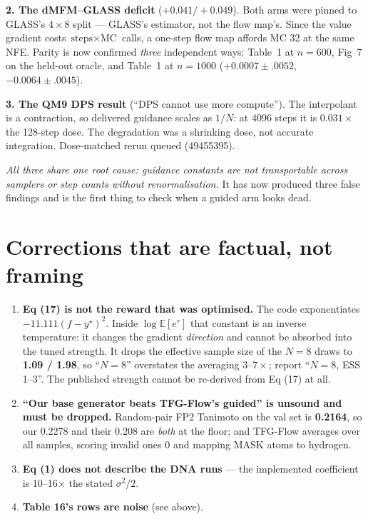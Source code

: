 \documentclass[10pt]{article}
\begin{document}
\textbf{2. The dMFM--GLASS deficit} ($+0.041/+0.049$). Both arms were pinned to GLASS's
$4\times8$ split --- GLASS's estimator, not the flow map's. Since the value gradient costs
$\text{steps}\times\text{MC}$ calls, a one-step flow map affords MC 32 at the same NFE. Parity is now
confirmed \emph{three} independent ways: Table~1 at $n{=}600$, Fig~7 on the held-out oracle, and
Table~1 at $n{=}1000$ ($+0.0007\pm.0052$, $-0.0064\pm.0045$).

\textbf{3. The QM9 DPS result} (``DPS cannot use more compute''). The interpolant is a contraction,
so delivered guidance scales as $1/N$: at 4096 steps it is $0.031\times$ the 128-step dose. The
degradation was a shrinking dose, not accurate integration. Dose-matched rerun queued (49455395).

\noindent\emph{All three share one root cause: guidance constants are not transportable across
samplers or step counts without renormalisation.} It has now produced three false findings and is
the first thing to check when a guided arm looks dead.

\section{Corrections that are factual, not framing}
\label{sec:factual}

\begin{enumerate}\itemsep2pt
\item \textbf{Eq (17) is not the reward that was optimised.} The code exponentiates
      $-11.111(f-y^\star)^2$. Inside $\log\mathbb{E}[e^r]$ that constant is an inverse temperature:
      it changes the gradient \emph{direction} and cannot be absorbed into the tuned strength. It
      drops the effective sample size of the $N{=}8$ draws to \textbf{1.09 / 1.98}, so ``$N=8$''
      overstates the averaging $3$--$7\times$; report ``$N=8$, ESS 1--3''. The published strength
      cannot be re-derived from Eq (17) at all.
\item \textbf{``Our base generator beats TFG-Flow's guided'' is unsound and must be dropped.}
      Random-pair FP2 Tanimoto on the val set is \textbf{0.2164}, so our 0.2278 and their 0.208 are
      \emph{both} at the floor; and TFG-Flow averages over all samples, scoring invalid ones 0 and
      mapping MASK atoms to hydrogen.
\item \textbf{Eq (1) does not describe the DNA runs} --- the implemented coefficient is 10--16$\times$
      the stated $\sigma^2/2$.
\item \textbf{Table 16's rows are noise} (see above).
\end{enumerate}
\end{document}
